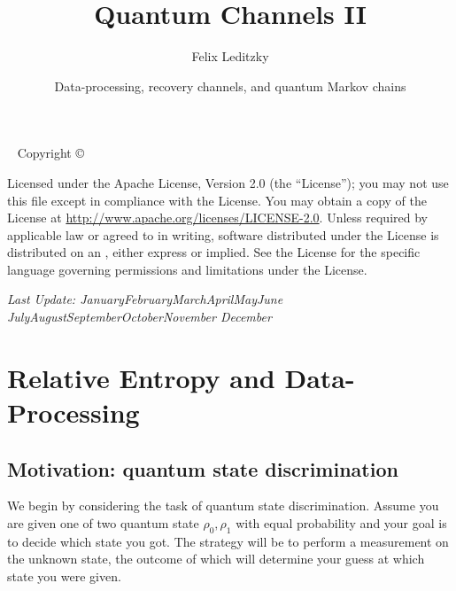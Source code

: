 \documentclass[notoc]{tufte-book}
\title{Quantum Channels II}
\date{Data-processing, recovery channels, and quantum Markov chains}
\author[Felix Leditzky]{Felix Leditzky}
\newcommand{\monthyear}{%
  \ifcase\month\or January\or February\or March\or April\or May\or June\or
  July\or August\or September\or October\or November\or
  December\fi\space\number\year
}
\newcommand{\blankpage}{\newpage\hbox{}\thispagestyle{empty}\newpage}
\begin{document}


\maketitle


\newpage
\begin{fullwidth}
~\vfill
\thispagestyle{empty}
\setlength{\parindent}{0pt}
\setlength{\parskip}{\baselineskip}
Copyright \copyright\ \the\year\ \thanklessauthor

\par\smallcaps{\thanklesspublisher}

\par{}

\par Licensed under the Apache License, Version 2.0 (the ``License''); you may not
use this file except in compliance with the License. You may obtain a copy
of the License at \url{http://www.apache.org/licenses/LICENSE-2.0}. Unless
required by applicable law or agreed to in writing, software distributed
under the License is distributed on an , either express or implied. See the
License for the specific language governing permissions and limitations
under the License.

\par\textit{Last Update: \monthyear}
\end{fullwidth}

\tableofcontents


\mainmatter
\chapter{Relative Entropy and Data-Processing}
\label{ch:relative-entropy-data-processing}

\section{Motivation: quantum state discrimination} \label{sec:quantum-state-discrimination}
We begin by considering the task of quantum state discrimination. Assume you are given one of two quantum state $\rho_0,\rho_1$ with equal probability and your goal is to decide which state you got. The strategy will be to perform a measurement on the unknown state, the outcome of which will determine your guess at which state you were given.
\end{document}
